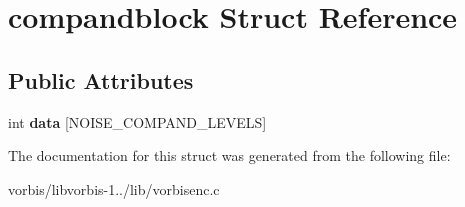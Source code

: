 \hypertarget{structcompandblock}{\section{compandblock Struct Reference}
\label{structcompandblock}
}
\subsection*{Public Attributes}
\begin{DoxyCompactItemize}
\item 
\hypertarget{structcompandblock_ac6dc1324ecb4f1172c8bde3ae48ed9ab}{int {\bfseries data} \mbox{[}N\+O\+I\+S\+E\+\_\+\+C\+O\+M\+P\+A\+N\+D\+\_\+\+L\+E\+V\+E\+L\+S\mbox{]}}\label{structcompandblock_ac6dc1324ecb4f1172c8bde3ae48ed9ab}

\end{DoxyCompactItemize}


The documentation for this struct was generated from the following file\+:\begin{DoxyCompactItemize}
\item 
vorbis/libvorbis-\/1../lib/vorbisenc.\+c\end{DoxyCompactItemize}
